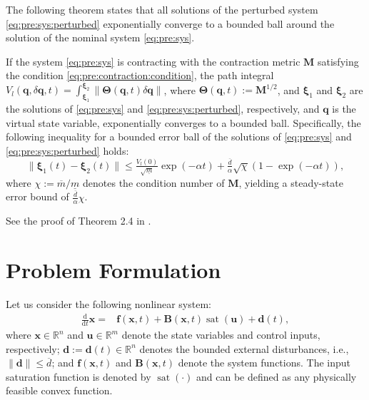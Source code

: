 \documentclass{ifacconf}
\newcommand\ie{\textrm{i.e.,\ }}
\newcommand\R{\mathbb{R}}
\newcommand*{\mv}[1]{\boldsymbol{#1}} %
\newcommand*{\mm}[1]{\boldsymbol{#1}} %
\newcommand*{\norm}[1]{\lVert #1 \rVert} %
\DeclareMathOperator{\mysat}{{sat}}       %
\newcommand\der{\mathrm d}
\newcommand*{\ddtt}{
   \tfrac{\der}{\der t}
}
\begin{document}
The following theorem states that all solutions of the perturbed system \eqref{eq:pre:sys:perturbed} exponentially converge to a bounded ball around the solution of the nominal system \eqref{eq:pre:sys}.
\begin{thm} \label{thm:contraction:perturbed}
   If the system \eqref{eq:pre:sys} is contracting with the contraction metric $\mm{M}$ satisfying the condition \eqref{eq:pre:contraction:condition}, the path integral $V_l(\mv{q},\delta\mv{q},t)=\int_{\mv{\xi}_1}^{\mv{\xi}_2}\norm{\mm{\Theta}(\mv{q},t)\delta\mv{q}}$, where $\mm{\Theta}(\mv{q},t):=\mm{M}^{1/2}$, and $\mv{\xi}_1$ and $\mv{\xi}_2$ are the solutions of \eqref{eq:pre:sys} and \eqref{eq:pre:sys:perturbed}, respectively, and $\mv{q}$ is the virtual state variable, exponentially converges to a bounded ball. 
   Specifically, the following inequality for a bounded error ball of the solutions of \eqref{eq:pre:sys} and \eqref{eq:pre:sys:perturbed} holds:
   \begin{equation}
      \norm{\mv\xi_1(t)-\mv\xi_2(t)}
      \le
      \tfrac{V_{l}(0)}{\sqrt{\underline{m}}}
      \exp(-\alpha t)
      +
      \tfrac{\overline d}{\alpha}
      \sqrt{\chi}
      (1-\exp(-\alpha t))
      ,
   \end{equation}
   where $\chi:=\overline{m}/\underline{m}$ denotes the condition number of $\mm{M}$, yielding a steady-state error bound of $\tfrac{\overline d}{\alpha}\chi$.
\end{thm}

\begin{pf}
   See the proof of Theorem 2.4 in \cite{Tsukamoto:2021aa}.
\end{pf}

\section{Problem Formulation} \label{sec:problem}

Let us consider the following nonlinear system:
\begin{equation} \label{eq:sys}
   \begin{aligned}   
      \ddtt{\mv{x}}
      =&
      \mv{f}(\mv{x},t)
      +
      \mm{B}(\mv{x},t)
      \mysat(\mv{u})   
      +
      \mv{d}(t)
      ,
   \end{aligned}
\end{equation}
where $\mv{x}\in\R^n$ and $\mv{u}\in\R^m$ denote the state variables and control inputs, respectively; $\mv{d}:=\mv{d}(t)\in\R^n$ denotes the bounded external disturbances, \ie $\norm{\mv{d}} \leq \overline{d}$; and $\mv{f}(\mv{x},t)$ and $\mm{B}(\mv{x},t)$ denote the system functions.
The input saturation function is denoted by $\mysat(\cdot)$ and can be defined as any physically feasible convex function.
\end{document}
